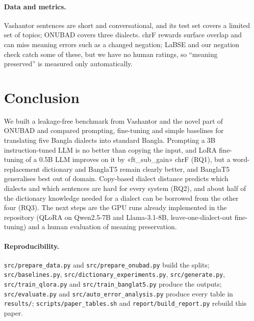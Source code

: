 \documentclass[10pt,twocolumn]{article}
\begin{document}
\paragraph{Data and metrics.} Vashantor sentences are short and conversational, and its test set covers a
limited set of topics; ONUBAD covers three dialects. chrF rewards surface overlap and can miss meaning errors
such as a changed negation; LaBSE and our negation check catch some of these, but we have no human ratings, so
``meaning preserved'' is measured only automatically.

\section{Conclusion}
We built a leakage-free benchmark from Vashantor and the novel part of ONUBAD and compared prompting,
fine-tuning and simple baselines for translating five Bangla dialects into standard Bangla. Prompting a 3B
instruction-tuned LLM is no better than copying the input, and LoRA fine-tuning of a 0.5B LLM improves on it by
«ft_sub_gain» chrF (RQ1), but a word-replacement dictionary and BanglaT5 remain clearly better, and BanglaT5
generalises best out of domain. Copy-based dialect distance predicts which dialects and which sentences are hard
for every system (RQ2), and about half of the dictionary knowledge needed for a dialect can be borrowed from the
other four (RQ3). The next steps are the GPU runs already implemented in the repository (QLoRA on Qwen2.5-7B and
Llama-3.1-8B, leave-one-dialect-out fine-tuning) and a human evaluation of meaning preservation.

{\raggedright\paragraph{Reproducibility.} \texttt{src/prepare\_data.py} and \texttt{src/prepare\_onubad.py} build the
splits; \texttt{src/baselines.py}, \texttt{src/dictionary\_experiments.py}, \texttt{src/generate.py},
\texttt{src/train\_qlora.py} and \texttt{src/train\_banglat5.py} produce the outputs; \texttt{src/evaluate.py}
and \texttt{src/auto\_error\_analysis.py} produce every table in \texttt{results/}; \texttt{scripts/paper\_tables.sh} and \texttt{report/build\_report.py} rebuild this paper.\par}
\end{document}
